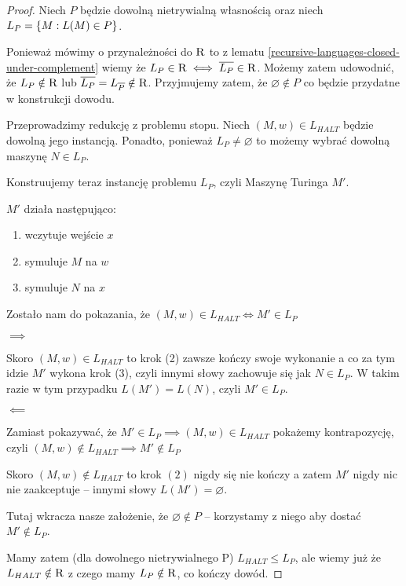 \begin{proof}
	Niech \( P \) będzie dowolną nietrywialną własnością oraz niech \( L_P = \set{M : L(M) \in P } \).

	Ponieważ mówimy o przynależności do \( \textsc{R} \) to z lematu \ref{recursive-languages-closed-under-complement} wiemy że \( L_P \in \textsc{R} \iff \overline{L_P} \in \textsc{R} \). Możemy zatem udowodnić, że \( L_P \notin \textsc{R} \) lub \( \overline{L_P} = L_{\overline{P}} \notin \textsc{R} \). Przyjmujemy zatem, że \( \varnothing \notin P \)  co będzie przydatne w konstrukcji dowodu.

	Przeprowadzimy redukcję z problemu stopu.
	Niech \( (M, w) \in L_{HALT} \) będzie dowolną jego instancją. Ponadto, ponieważ \( L_P \neq \varnothing \) to możemy wybrać dowolną maszynę \( N \in L_P \).

	Konstruujemy teraz instancję problemu \( L_P \), czyli Maszynę Turinga \( M' \).

	\( M' \) działa następująco:
	\begin{enumerate}
		\item wczytuje wejście \( x \)
		\item symuluje \( M \) na \( w \)
		\item symuluje \( N \) na \( x \)
	\end{enumerate}

	Zostało nam do pokazania, że \( (M, w) \in L_{HALT} \iff M' \in L_P \)
	\begin{description}
		\item \( \implies \)

		      Skoro \( (M, w) \in L_{HALT} \) to krok (2) zawsze kończy swoje wykonanie a co za tym idzie \( M' \) wykona krok (3), czyli innymi słowy zachowuje się jak \( N \in L_P \). W takim razie w tym przypadku \( L(M') = L(N) \), czyli \( M' \in L_P \).

		\item \( \impliedby \)

		      Zamiast pokazywać, że \( M' \in L_P \implies (M, w) \in L_{HALT} \) pokażemy kontrapozycję, czyli \( (M, w) \notin L_{HALT} \implies M' \notin L_P \)

		      Skoro \( (M, w) \notin L_{HALT} \) to krok \( (2) \) nigdy się nie kończy a zatem \( M' \) nigdy nic nie zaakceptuje -- innymi słowy \( L(M') = \varnothing \).

		      Tutaj wkracza nasze założenie, że \( \varnothing \notin P \) -- korzystamy z niego aby dostać \( M' \notin L_P \).
	\end{description}

	Mamy zatem (dla dowolnego nietrywialnego P) \( L_{HALT} \leq L_P \), ale wiemy już że \( L_{HALT} \notin \textsc{R} \) z czego mamy \( L_P \notin \textsc{R} \), co kończy dowód.

\end{proof}



